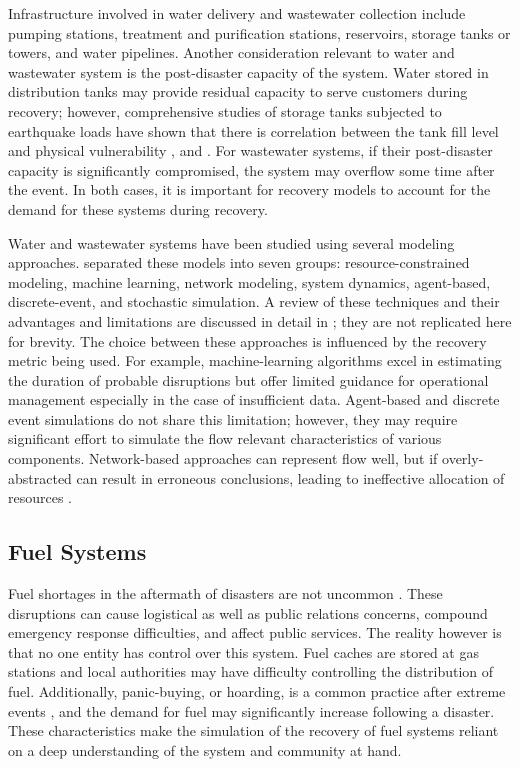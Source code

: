 Infrastructure involved in water delivery and wastewater collection include pumping stations, treatment and purification stations, reservoirs, storage tanks or towers, and water pipelines. Another consideration relevant to water and wastewater system is the post-disaster capacity of the system. Water stored in distribution tanks may provide residual capacity to serve customers during recovery; however, comprehensive studies of storage tanks subjected to earthquake loads have shown that there is correlation between the tank fill level and physical vulnerability \citep{cooper1997study, orourke2000seismic}, and \citep{eidinger2012recent}. For wastewater systems, if their post-disaster capacity is significantly compromised, the system may overflow some time after the event. In both cases, it is important for recovery models to account for the demand for these systems during recovery.\

Water and wastewater systems have been studied using several modeling approaches. \citet{miles2019community} separated these models into seven groups: resource-constrained modeling, machine learning, network modeling, system dynamics, agent-based, discrete-event, and stochastic simulation. A review of these techniques and their advantages and limitations are discussed in detail in \citet{miles2019community}; they are not replicated here for brevity. The choice between these approaches is influenced by the recovery metric being used. For example, machine-learning algorithms excel in estimating the duration of probable disruptions but offer limited guidance for operational management especially in the case of insufficient data. Agent-based and discrete event simulations do not share this limitation; however, they may require significant effort to simulate the flow relevant characteristics of various components. Network-based approaches can represent flow well, but if overly-abstracted can result in erroneous conclusions, leading to ineffective allocation of resources \citep{Hines2010a}. \

\subsection{Fuel Systems}
Fuel shortages in the aftermath of disasters are not uncommon \citep{Smythe2013, Holguin-Veras2014}. These disruptions can cause logistical as well as public relations concerns, compound emergency response difficulties, and affect public services. The reality however is that no one entity has control over this system. Fuel caches are stored at gas stations and local authorities may have difficulty controlling the distribution of fuel. Additionally, panic-buying, or hoarding, is a common practice after extreme events \citep{shen2017development, helbing2006disasters}, and the demand for fuel may significantly increase following a disaster. These characteristics make the simulation of the recovery of fuel systems reliant on a deep understanding of the system and community at hand. \

